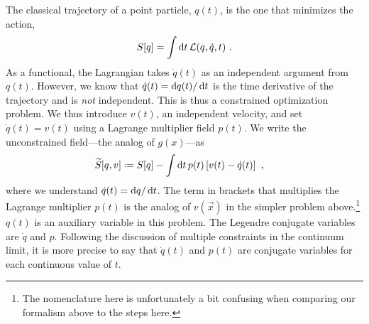 The classical trajectory of a point particle, $q(t)$, is the one that minimizes the action,
\begin{align}
    S[q] = \int \operatorname{d}\mkern-3mu^{}\mkern-1mu{t}\, \mathcal L(q,\dot q, t) \ .
\end{align}
As a functional, the Lagrangian takes $\dot q(t)$ as an independent argument from $q(t)$. However, we know that $\dot q(t) = \operatorname{d}\mkern-3mu^{}\mkern-1mu{q}(t)/\operatorname{d}\mkern-3mu^{}\mkern-1mu{t}$ is the time derivative of the trajectory and is \emph{not} independent. This is thus a constrained optimization problem. We thus introduce $v(t)$, an independent velocity, and set $\dot q(t) = v(t)$ using a Lagrange multiplier field $p(t)$. We write the unconstrained field---the analog of $g(x)$---as
\begin{align}
    \tilde S[q,v] &\defeq
    S[q] - \int \D{t}\, p(t)\left[v(t)-\dot q(t)\right] \ ,
\end{align}
where we understand $\dot q(t) = \operatorname{d}\mkern-3mu^{}\mkern-1mu{q}/\operatorname{d}\mkern-3mu^{}\mkern-1mu{t}$. 
% 
The term in brackets that multiplies the Lagrange multiplier $p(t)$ is the analog of $v(\vec{x})$ in the simpler problem above.\footnote{The nomenclature here is unfortunately a bit confusing when comparing our formalism above to the steps here.}
% 
$q(t)$ is an auxiliary variable in this problem.
% 
The Legendre conjugate variables are $\dot q$ and $p$. Following the discussion of multiple constraints in the continuum limit, it is more precise to say that $\dot q(t)$ and $p(t)$ are conjugate variables for each continuous value of $t$.

